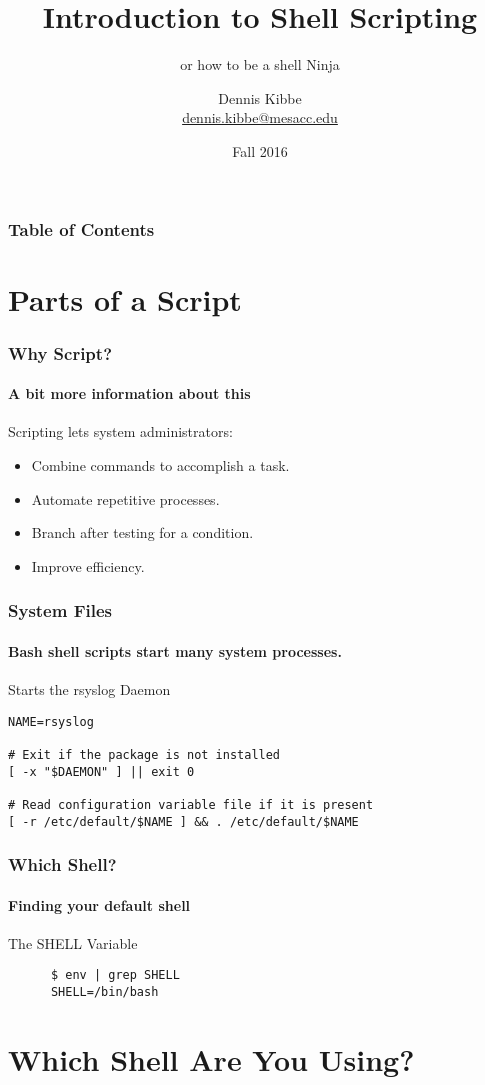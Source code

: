 \documentclass[12pt,handout,aspectratio=169]{beamer}
\title{Introduction to Shell Scripting}
\subtitle{or how to be a shell Ninja}
\author{Dennis Kibbe \\\href{mailto:dennis.kibbe@mesacc.edu}{dennis.kibbe@mesacc.edu}}
\institute{Mesa Community College \\Network Academy}
\date{Fall 2016}
\begin{document}
\maketitle
\begin{frame}
\frametitle{Table of Contents}
\tableofcontents[currentsection]
\end{frame}
\addtocounter{framenumber}{-1}
\section{Parts of a Script}
\begin{frame}
  \frametitle{Why Script?}
  \framesubtitle{A bit more information about this}
  Scripting lets system administrators:
  \begin{itemize}
  \item Combine commands to accomplish a task.
    \pause
  \item Automate repetitive processes.
    \pause
  \item Branch after testing for a condition.
    \pause
  \item Improve efficiency.
    \pause
  \end{itemize}
\end{frame}
\begin{frame}[fragile]
  \frametitle{System Files}
  \framesubtitle{Bash shell scripts start many system processes.}
  \begin{block}{Starts the rsyslog Daemon}
    \begin{verbatim}
NAME=rsyslog

# Exit if the package is not installed
[ -x "$DAEMON" ] || exit 0

# Read configuration variable file if it is present
[ -r /etc/default/$NAME ] && . /etc/default/$NAME
\end{verbatim}
\end{block}
\end{frame}
\begin{frame}[fragile]
  \frametitle{Which Shell?}
  \framesubtitle{Finding your default shell}
  \begin{block}{The SHELL Variable}
    \begin{verbatim}
      $ env | grep SHELL
      SHELL=/bin/bash
    \end{verbatim}
  \end{block}
\end{frame}

\section{Which Shell Are You Using?}
\end{document}
